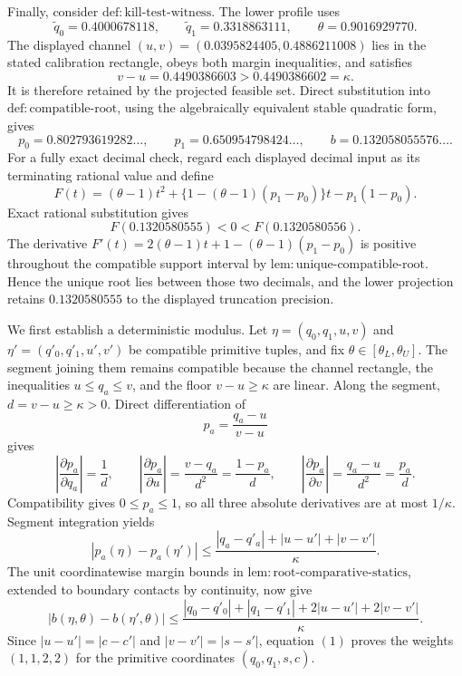 Finally, consider \(\mathrm{def:kill\text{-}test\text{-}witness}\). The lower profile uses
\[
\widetilde q_0=0.4000678118,
\qquad
\widetilde q_1=0.3318863111,
\qquad
\theta=0.9016929770.
\]
The displayed channel \((u,v)=(0.0395824405,0.4886211008)\) lies in the stated calibration rectangle, obeys both margin inequalities, and satisfies
\[
v-u=0.4490386603>0.4490386602=\kappa.
\]
It is therefore retained by the projected feasible set. Direct substitution into \(\mathrm{def:compatible\text{-}root}\), using the algebraically equivalent stable quadratic form, gives
\[
p_0=0.802793619282\ldots,
\qquad
p_1=0.650954798424\ldots,
\qquad
b=0.132058055576\ldots.
\]
For a fully exact decimal check, regard each displayed decimal input as its terminating rational value and define
\[
F(t)=(\theta-1)t^2+
\{1-(\theta-1)(p_1-p_0)\}t-p_1(1-p_0).
\]
Exact rational substitution gives
\[
F(0.1320580555)<0<F(0.1320580556).
\]
The derivative \(F'(t)=2(\theta-1)t+1-(\theta-1)(p_1-p_0)\) is positive throughout the compatible support interval by \(\mathrm{lem:unique\text{-}compatible\text{-}root}\). Hence the unique root lies between those two decimals, and the lower projection retains \(0.1320580555\) to the displayed truncation precision.

We first establish a deterministic modulus. Let \(\eta=(q_0,q_1,u,v)\) and \(\eta'=(q'_0,q'_1,u',v')\) be compatible primitive tuples, and fix \(\theta\in[\theta_L,\theta_U]\). The segment joining them remains compatible because the channel rectangle, the inequalities \(u\leq q_a\leq v\), and the floor \(v-u\geq\kappa\) are linear. Along the segment, \(d=v-u\geq\kappa>0\). Direct differentiation of
\[
p_a=\frac{q_a-u}{v-u}
\]
gives
\[
\left|\frac{\partial p_a}{\partial q_a}\right|=\frac1d,
\qquad
\left|\frac{\partial p_a}{\partial u}\right|
=\frac{v-q_a}{d^2}=\frac{1-p_a}{d},
\qquad
\left|\frac{\partial p_a}{\partial v}\right|
=\frac{q_a-u}{d^2}=\frac{p_a}{d}.
\]
Compatibility gives \(0\leq p_a\leq1\), so all three absolute derivatives are at most \(1/\kappa\). Segment integration yields
\[
|p_a(\eta)-p_a(\eta')|
\leq\frac{|q_a-q'_a|+|u-u'|+|v-v'|}{\kappa}.
\]
The unit coordinatewise margin bounds in \(\mathrm{lem:root\text{-}comparative\text{-}statics}\), extended to boundary contacts by continuity, now give
\[
|b(\eta,\theta)-b(\eta',\theta)|
\leq\frac{|q_0-q'_0|+|q_1-q'_1|
+2|u-u'|+2|v-v'|}{\kappa}.
\tag{1}
\]
Since \(|u-u'|=|c-c'|\) and \(|v-v'|=|s-s'|\), equation \((1)\) proves the weights \((1,1,2,2)\) for the primitive coordinates \((q_0,q_1,s,c)\).

